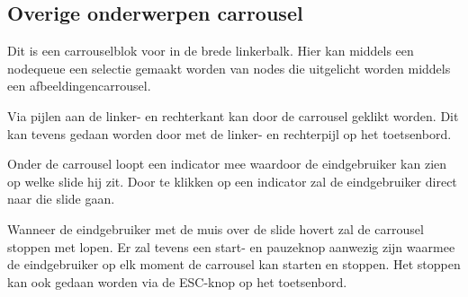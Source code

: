 \subsection{Overige onderwerpen carrousel}
\label{sec:overigeonderwerpencarrousel}
Dit is een carrouselblok voor in de brede linkerbalk. Hier kan middels een nodequeue een selectie gemaakt worden van nodes die uitgelicht worden middels een afbeeldingencarrousel. 

Via pijlen aan de linker- en rechterkant kan door de carrousel geklikt worden. Dit kan tevens gedaan worden door met de linker- en rechterpijl op het toetsenbord.

Onder de carrousel loopt een indicator mee waardoor de eindgebruiker kan zien op welke slide hij zit. Door te klikken op een indicator zal de eindgebruiker direct naar die slide gaan. 

Wanneer de eindgebruiker met de muis over de slide hovert zal de carrousel stoppen met lopen. Er zal tevens een start- en pauzeknop aanwezig zijn waarmee de eindgebruiker op elk moment de carrousel kan starten en stoppen. Het stoppen kan ook gedaan worden via de ESC-knop op het toetsenbord.  